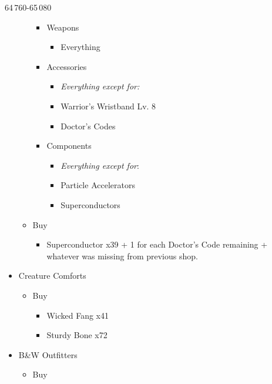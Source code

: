 \begin{paracol}{2}
\begin{shop}{64\,760-65\,080}
\begin{itemize}
\begin{itemize}
				            \begin{itemize}
					            \item Weapons
					                  \begin{itemize}
						                  \item Everything
					                  \end{itemize}
					            \item Accessories
					                  \begin{itemize}
						                  \item \textit{Everything except for:}
						                  \item Warrior's Wristband Lv. 8
						                  \item Doctor's Codes
					                  \end{itemize}
					            \item Components
					                  \begin{itemize}
						                  \item \textit{Everything except for}:
						                  \item Particle Accelerators
						                  \item Superconductors
					                  \end{itemize}
				            \end{itemize}
				      \item Buy
				            \begin{itemize}
					            \item Superconductor x39 + 1 for each Doctor's Code remaining + whatever was missing from previous shop.
				            \end{itemize}
			      \end{itemize}
			\item Creature Comforts
			      \begin{itemize}
				      \item Buy
				            \begin{itemize}
					            \item Wicked Fang x41
					            \item Sturdy Bone x72
				            \end{itemize}
			      \end{itemize}
			\item B\&W Outfitters
			      \begin{itemize}
				      \item Buy

\end{itemize}
\end{itemize}
\end{shop}
\end{paracol}
